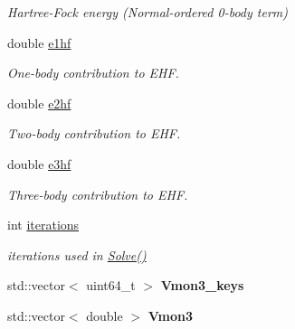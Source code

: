 \begin{DoxyCompactItemize}
\begin{DoxyCompactList}\small\item\em Hartree-\/\-Fock energy (Normal-\/ordered 0-\/body term) \end{DoxyCompactList}\item 
\hypertarget{classHartreeFock_a0f94913a966701c27fde108b98e89b41}{double \hyperlink{classHartreeFock_a0f94913a966701c27fde108b98e89b41}{e1hf}}\label{classHartreeFock_a0f94913a966701c27fde108b98e89b41}

\begin{DoxyCompactList}\small\item\em One-\/body contribution to E\-H\-F. \end{DoxyCompactList}\item 
\hypertarget{classHartreeFock_a29cddead4c300ca5c3505f04e1a630bc}{double \hyperlink{classHartreeFock_a29cddead4c300ca5c3505f04e1a630bc}{e2hf}}\label{classHartreeFock_a29cddead4c300ca5c3505f04e1a630bc}

\begin{DoxyCompactList}\small\item\em Two-\/body contribution to E\-H\-F. \end{DoxyCompactList}\item 
\hypertarget{classHartreeFock_a89a37a2413483b1b484554c4a4f6755e}{double \hyperlink{classHartreeFock_a89a37a2413483b1b484554c4a4f6755e}{e3hf}}\label{classHartreeFock_a89a37a2413483b1b484554c4a4f6755e}

\begin{DoxyCompactList}\small\item\em Three-\/body contribution to E\-H\-F. \end{DoxyCompactList}\item 
\hypertarget{classHartreeFock_a7658fa0b1b05dfa7bf7b8aa7e5fd6bb3}{int \hyperlink{classHartreeFock_a7658fa0b1b05dfa7bf7b8aa7e5fd6bb3}{iterations}}\label{classHartreeFock_a7658fa0b1b05dfa7bf7b8aa7e5fd6bb3}

\begin{DoxyCompactList}\small\item\em iterations used in \hyperlink{classHartreeFock_a0666507747c17845ab4f74b97414703c}{Solve()} \end{DoxyCompactList}\item 
\hypertarget{classHartreeFock_aac4104112ce3a60a8fb86305df98d2e9}{std\-::vector$<$ uint64\-\_\-t $>$ {\bfseries Vmon3\-\_\-keys}}\label{classHartreeFock_aac4104112ce3a60a8fb86305df98d2e9}

\item 
\hypertarget{classHartreeFock_ad7ca83cf6ad8949daffd11ba8f2c03fd}{std\-::vector$<$ double $>$ {\bfseries Vmon3}}\label{classHartreeFock_ad7ca83cf6ad8949daffd11ba8f2c03fd}


\end{DoxyCompactItemize}
